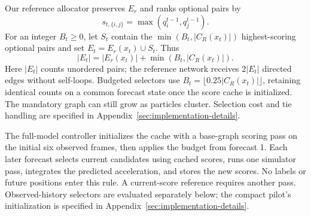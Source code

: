Our reference allocator preserves $E_r$ and ranks optional pairs by
\begin{equation}
 s_{t,\{i,j\}}=\max(q_i^{t-1},q_j^{t-1}).
\end{equation}
For an integer $B_t\ge0$, let $S_t$ contain the $\min(B_t,|C_R(x_t)|)$ highest-scoring optional pairs and set $E_t=E_r(x_t)\cup S_t$. Thus
\begin{equation}
 |E_t|=|E_r(x_t)|+\min(B_t,|C_R(x_t)|).
 \label{eq:budget}
\end{equation}
Here $|E_t|$ counts unordered pairs; the reference network receives $2|E_t|$ directed edges without self-loops. Budgeted selectors use $B_t=\lfloor0.25|C_R(x_t)|\rfloor$, retaining identical counts on a common forecast state once the score cache is initialized. The mandatory graph can still grow as particles cluster. Selection cost and tie handling are specified in Appendix~\ref{sec:implementation-details}.

The full-model controller initializes the cache with a base-graph scoring pass on the initial six observed frames, then applies the budget from forecast 1. Each later forecast selects current candidates using cached scores, runs one simulator pass, integrates the predicted acceleration, and stores the new scores. No labels or future positions enter this rule. A current-score reference requires another pass. Observed-history selectors are evaluated separately below; the compact pilot's initialization is specified in Appendix~\ref{sec:implementation-details}.


